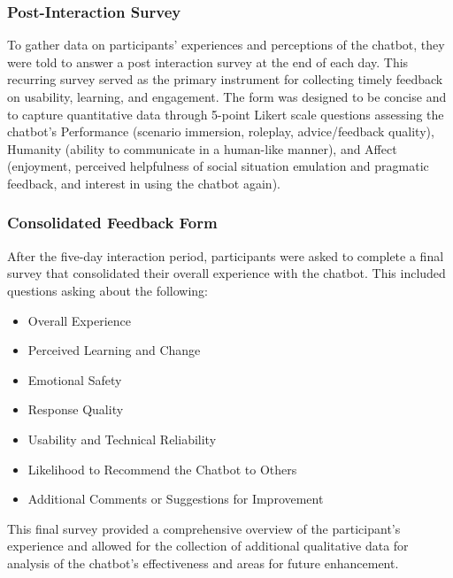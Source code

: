 \subsubsection{Post-Interaction Survey}
\indent To gather data on participants' experiences and perceptions of the chatbot, they were told to answer a post interaction survey at the end of each day. 
This recurring survey served as the primary instrument for collecting timely feedback on usability, learning, and engagement. The form was designed to be concise 
and to capture quantitative data through 5-point Likert scale questions assessing the chatbot's Performance (scenario immersion, roleplay, advice/feedback quality), 
Humanity (ability to communicate in a human-like manner), and Affect (enjoyment, perceived helpfulness of social situation emulation and pragmatic feedback, and interest in using the chatbot again).


\subsubsection{Consolidated Feedback Form}
\indent After the five-day interaction period, participants were asked to complete a final survey that consolidated their overall experience with the chatbot. 
This included questions asking about the following:
\begin{itemize}
\item Overall Experience
\item Perceived Learning and Change
\item Emotional Safety
\item Response Quality
\item Usability and Technical Reliability
\item Likelihood to Recommend the Chatbot to Others
\item Additional Comments or Suggestions for Improvement
\end{itemize}

This final survey provided a comprehensive overview of the participant's experience and allowed for the collection of additional qualitative data for analysis of the chatbot's effectiveness 
and areas for future enhancement.

